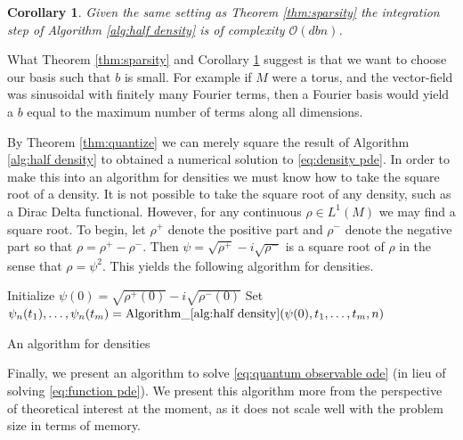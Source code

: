 \documentclass[final,leqno]{siamltex1213}
\newtheorem{cor}[thm]{Corollary}
\begin{document}
\begin{cor} \label{cor:sparsity}
	Given the same setting as Theorem \ref{thm:sparsity} the integration step of Algorithm \ref{alg:half density} is of complexity $\mathcal{O}( dbn)$.
\end{cor}

What Theorem \ref{thm:sparsity} and Corollary \ref{cor:sparsity} suggest is that we want to choose our basis such that $b$ is small.
For example if $M$ were a torus, and the vector-field was sinusoidal with finitely many Fourier terms, then a Fourier basis would yield a $b$ equal to the maximum number of terms along all dimensions.

By Theorem \ref{thm:quantize} we can merely square the result of Algorithm \ref{alg:half density} to obtained a numerical solution to \eqref{eq:density pde}.
In order to make this into an algorithm for densities we must know how to take the square root of a density.
It is not possible to take the square root of any density, such as a Dirac Delta functional.
However, for any continuous $\rho \in L^{1}(M)$ we may find a square root.
To begin, let $\rho^{+}$ denote the positive part and $\rho^{-}$ denote the negative part so that $\rho = \rho^{+} - \rho^{-}$.
Then $\psi = \sqrt{\rho^{+}} - i \sqrt{\rho^{-}}$ is a square root of $\rho$ in the sense that $\rho = \psi^{2}$.
This yields the following algorithm for densities.

\begin{algorithm}[H] 
	Initialize $\psi(0) =  \sqrt{\rho^{+}(0)} - i \sqrt{\rho^{-}(0)}$\;
	Set $\psi_{n}(t_{1}),\dots,\psi_{n}(t_{m}) =  \operatorname{ Algorithm\_ \ref{alg:half density} }( \psi(0) , t_{1} , \dots,t_{m}, n )$\;
	\caption{An algorithm for densities} \label{alg:density}
\end{algorithm}


Finally, we present an algorithm to solve \eqref{eq:quantum observable ode} (in lieu of solving \eqref{eq:function pde}).
We present this algorithm more from the perspective of theoretical interest at the moment, as it does not scale well with the problem size in terms of memory.
\end{document}
